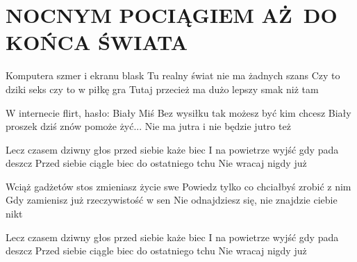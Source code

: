 \documentclass[../../../songbook.tex]{subfiles}
\begin{document}
\TabPositions{9cm} %
\section*{NOCNYM POCIĄGIEM AŻ DO KOŃCA ŚWIATA}
{}
\vspace{0.5cm}
Komputera szmer i ekranu blask				 \newline	
Tu realny świat nie ma żadnych szans		 \newline	
Czy to dziki seks czy to w piłkę gra		 \newline	
Tutaj przecież ma dużo lepszy smak niż tam	 \newline	

W internecie flirt, hasło: Biały Miś		 \newline
Bez wysiłku tak możesz być kim chcesz		 \newline
Biały proszek dziś znów pomoże żyć...		 \newline
Nie ma jutra i nie będzie jutro też		 \newline

\-\hspace{1cm} Lecz czasem dziwny głos przed siebie każe biec	 \newline
\-\hspace{1cm} I na powietrze wyjść gdy pada deszcz				 \newline
\-\hspace{1cm} Przed siebie ciągle biec do ostatniego tchu		 \newline
\-\hspace{1cm} Nie wracaj nigdy już								 \newline

Wciąż gadżetów stos zmieniasz życie swe		 \newline
Powiedz tylko co chciałbyś zrobić z nim		 \newline
Gdy zamienisz już rzeczywistość w sen		 \newline
Nie odnajdziesz się, nie znajdzie ciebie nikt		 \newline

\-\hspace{1cm} Lecz czasem dziwny głos przed siebie każe biec		 \newline
\-\hspace{1cm} I na powietrze wyjść gdy pada deszcz			 \newline
\-\hspace{1cm} Przed siebie ciągle biec do ostatniego tchu		 \newline
\-\hspace{1cm} Nie wracaj nigdy już		 \newline
\end{document}
